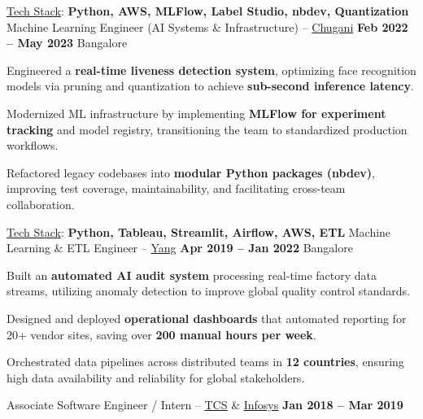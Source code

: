 \documentclass[11pt, a4paper]{awesome-cv}
\begin{document}
\begin{cventries}
\vspace{1.0em}

\cventry
  {\underline{Tech Stack}: \textbf{Python, AWS, MLFlow, Label Studio, nbdev, Quantization}}
  {Machine Learning Engineer (AI Systems \& Infrastructure) – \underline{Chugani}}
  {\textbf{Feb 2022 – May 2023}}
  {Bangalore}
  {
    \begin{cvitems}
      \item {Engineered a \textbf{real-time liveness detection system}, optimizing face recognition models via pruning and quantization to achieve \textbf{sub-second inference latency}.}
      \item {Modernized ML infrastructure by implementing \textbf{MLFlow for experiment tracking} and model registry, transitioning the team to standardized production workflows.}
      \item {Refactored legacy codebases into \textbf{modular Python packages (nbdev)}, improving test coverage, maintainability, and facilitating cross-team collaboration.}
    \end{cvitems}
  }

\vspace{1.0em}

\cventry
  {\underline{Tech Stack}: \textbf{Python, Tableau, Streamlit, Airflow, AWS, ETL}}
  {Machine Learning \& ETL Engineer – \underline{Yang}}
  {\textbf{Apr 2019 – Jan 2022}}
  {Bangalore}
  {
    \begin{cvitems}
      \item {Built an \textbf{automated AI audit system} processing real-time factory data streams, utilizing anomaly detection to improve global quality control standards.}
      \item {Designed and deployed \textbf{operational dashboards} that automated reporting for 20+ vendor sites, saving over \textbf{200 manual hours per week}.}
      \item {Orchestrated data pipelines across distributed teams in \textbf{12 countries}, ensuring high data availability and reliability for global stakeholders.}
    \end{cvitems}
  }

\vspace{1.0em}

\cventry
  {}
  {Associate Software Engineer / Intern – \underline{\href{https://www.tcs.com/}{TCS}} \& \underline{\href{https://www.infosys.com/}{Infosys}}}
  {\textbf{Jan 2018 – Mar 2019}}
  {}
  {
  }

\end{cventries}
\end{document}
